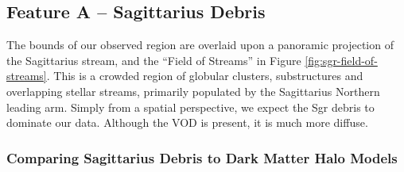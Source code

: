 \documentclass[preprint2]{aastex}
\begin{document}
	\subsection{Feature A \--- Sagittarius Debris}
	\label{sec:sgr-debris}


		
	The bounds of our observed region are overlaid upon a panoramic projection of the Sagittarius stream, and the  ``Field of Streams''  \citep{Belokurov;et-al_2006} in Figure \ref{fig:sgr-field-of-streams}. This is a crowded region of globular clusters, substructures and overlapping stellar streams, primarily populated by the Sagittarius Northern leading arm. Simply from a spatial perspective, we expect the Sgr debris to dominate our data. Although the VOD is present, it is much more diffuse. 

	\subsubsection{Comparing Sagittarius Debris to Dark Matter Halo Models}	
\end{document}
